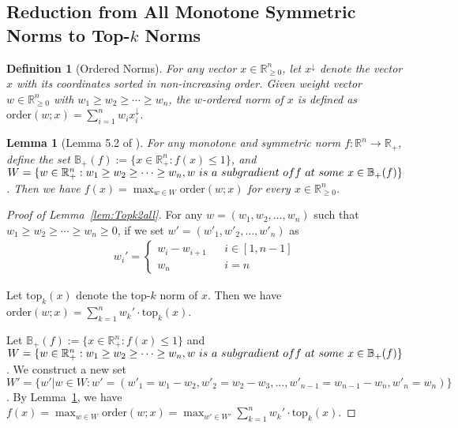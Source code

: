 \documentclass[11pt]{article}
\newcommand{\R}{\mathbb{R}}
\newtheorem{lemma}[theorem]{Lemma}
\newtheorem{definition}[theorem]{Definition}
\newcommand{\topk}{\mathrm{top}_k}
\newcommand{\order}{\mathrm{order}}
\begin{document}
\begin{CJK*}{UTF8}{gbsn}
%
 






\appendix

\section{Reduction from All Monotone Symmetric Norms to Top-$k$ Norms}
\label{sec:all-norm}



\begin{definition}[Ordered Norms]
    For any vector $x\in \mathbb{R}_{\geq 0}^n$, let $x^\downarrow$ denote the vector $x$ with its coordinates sorted in non-increasing order. Given weight vector $w \in \R_{\geq 0}^n$ with $w_1 \geq w_2 \geq \cdots \geq w_n$, the $w$-ordered norm of $x$ is defined as $\order(w;x)=\sum_{i=1}^n w_i x_i^\downarrow$.
\end{definition}


\begin{lemma}[Lemma 5.2 of \cite{chakrabarty2019approximation}]\label{lem:Ordered2all}
    For any monotone and symmetric norm $f:\mathbb{R}^n\rightarrow \mathbb{R}_+$, define the set $\mathbb{B}_+(f):=\{x\in \mathbb{R}_+^n:f(x)\le 1\}$, and $W=\{w\in \mathbb{R}_+^n : w_1\ge w_2 \ge \cdots \ge w_n, w\ is\ a\ subgradient\ of\\ f\ at\ some\ x\in \mathbb{B}_+(f)\}$. Then we have $f(x)=\max_{w\in W} \order(w;x)$ for every $x\in \mathbb{R}_{\geq 0}^n$.
\end{lemma}

\lemmatopktolpnorm*
\begin{proof}[Proof of Lemma~\ref{lem:Topk2all}]
    For any $w=(w_1,w_2,\dots,w_n)$ such that $w_1\ge w_2 \ge \cdots \ge w_n\ge 0$, if we set $w'=(w'_1,w'_2,\dots,w'_n)$ as 
    \begin{align*}
    w_i'= \left\{
        \begin{array}{rcl}
            w_i-w_{i+1} & & {i\in [1,n-1]}\\
            w_n & & {i=n}
        \end{array}
        \right.
    \end{align*}

    Let $\topk(x)$ denote the top-$k$ norm of $x$. Then we have $\order(w;x)=\sum_{k=1}^n w_k'\cdot \topk(x)$.

    Let $\mathbb{B}_+(f):=\{x\in \mathbb{R}_+^n:f(x)\le 1\}$ and $W=\{w\in \mathbb{R}_+^n : w_1\ge w_2 \ge \cdots \ge w_n, w\ is\ a\ subgradient\ of\\ f\ at\ some\ x\in \mathbb{B}_+(f)\}$. We construct a new set $W'=\{w'|w\in W : w'=(w'_1 = w_1-w_2, w'_2 = w_2-w_3,\dots,w'_{n- 1} = w_{n-1}-w_n, w'_n = w_n) \}$. By Lemma~\ref{lem:Ordered2all}, we have $f(x)=\max_{w\in W} \order(w;x)=\max_{w'\in W'}\sum_{k=1}^n w_k'\cdot \topk(x)$.


\end{proof}
\end{CJK*}
\end{document}
